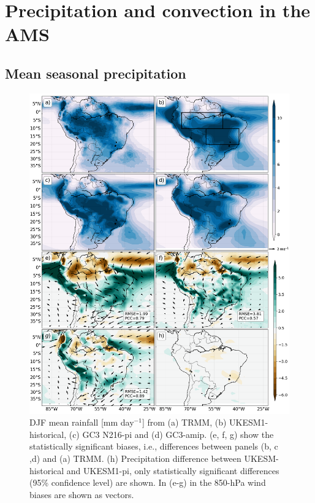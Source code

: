 \section{Precipitation and convection in the AMS}\label{sq:precip}

\subsection{Mean seasonal precipitation}

\begin{figure}[b!]
\centering
 \includegraphics[width=0.875\linewidth]{figures/fig6.png}
\caption[Austral summer mean rainfall in the South American monsoon]{ DJF mean rainfall [mm day$^{-1}$] from (a) TRMM, (b) UKESM1-historical, (c) GC3 N216-pi and (d) GC3-amip. (e, f, g) show the statistically significant biases, i.e., differences between panels (b, c ,d) and (a) TRMM. (h) Precipitation difference between UKESM-historical and  UKESM1-pi, only statistically significant differences (95\% confidence level) are shown. In (e-g) in the 850-hPa wind biases are shown as vectors. }
\label{fig:6}
\end{figure}

